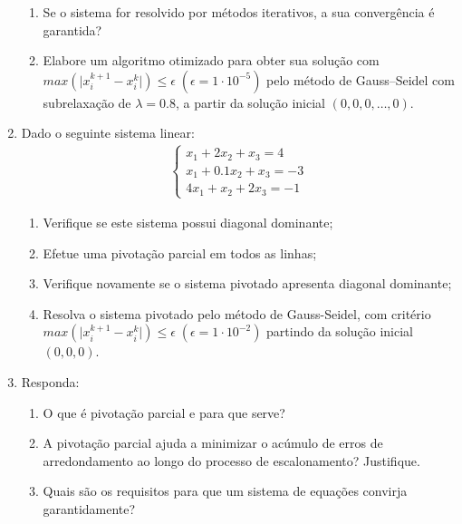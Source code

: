 \documentclass[12pt]{article}
\newenvironment{smallitem}{
    \vspace{-2mm}
    \begin{enumerate}
    \setlength{\parskip}{0pt}
    \setlength{\itemsep}{2pt}
}{
    \vspace{-2mm}
    \end{enumerate}
}
\begin{document}
\begin{enumerate}[label=\textbf{\arabic*})]
\begin{smallitem}
\item Se o sistema for resolvido por métodos iterativos, a sua convergência é
garantida?

\item Elabore um algoritmo otimizado para obter sua solução com $max(\vert
x_i^{k + 1} - x_i^k \vert) \leq \epsilon \; (\epsilon = 1 \cdot 10^{-5})$ pelo
método de Gauss--Seidel com subrelaxação de $\lambda = 0.8$, a partir da
solução inicial $(0, 0, 0, \dots, 0)$.

\end{smallitem}

\item Dado o seguinte sistema linear:
\begin{align*}
\begin{cases}
x_1 + 2x_2 + x_3 = 4 \\
x_1 + 0.1x_2 + x_3 = -3 \\
4x_1 + x_2 + 2x_3 = -1
\end{cases}
\end{align*}

\begin{smallitem}

\item Verifique se este sistema possui diagonal dominante;

\item Efetue uma pivotação parcial em todos as linhas;

\item Verifique novamente se o sistema pivotado apresenta diagonal dominante;

\item Resolva o sistema pivotado pelo método de Gauss-Seidel, com critério
$max(\vert x_i^{k + 1} - x_i^k \vert) \leq \epsilon \; (\epsilon = 1 \cdot
10^{-2})$ partindo da solução inicial $(0, 0, 0)$.

\end{smallitem}

\item Responda:

\begin{smallitem}

\item O que é pivotação parcial e para que serve?

\item A pivotação parcial ajuda a minimizar o acúmulo de erros de
arredondamento ao longo do processo de escalonamento? Justifique.

\item Quais são os requisitos para que um sistema de equações convirja
garantidamente?


\end{smallitem}
\end{enumerate}
\end{document}
